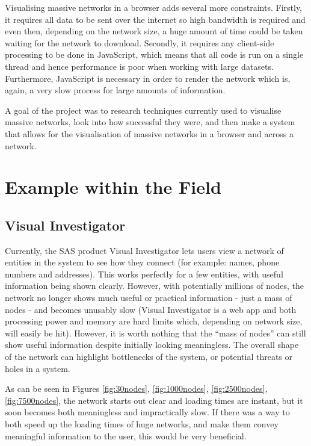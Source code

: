 \documentclass[../dissertation.tex]{subfiles}
\begin{document}
Visualising massive networks in a browser adds several more constraints. Firstly, it requires all data to be sent over the internet so high bandwidth is required and even then, depending on the network size, a huge amount of time could be taken waiting for the network to download. Secondly, it requires any client-side processing to be done in JavaScript, which means that all code is run on a single thread and hence performance is poor when working with large datasets. Furthermore, JavaScript is necessary in order to render the network which is, again, a very slow process for large amounts of information. 

A goal of the project was to research techniques currently used to visualise massive networks, look into how successful they were, and then make a system that allows for the visualisation of massive networks in a browser and across a network. 

\section{Example within the Field}

\subsection{Visual Investigator}
Currently, the SAS product Visual Investigator \cite{sasvi} lets users view a network of entities in the system to see how they connect (for example: names, phone numbers and addresses). This works perfectly for a few entities, with useful information being shown clearly. However, with potentially millions of nodes, the network no longer shows much useful or practical information - just a mass of nodes - and becomes unusably slow (Visual Investigator is a web app and both processing power and memory are hard limits which, depending on network size, will easily be hit). However, it is worth nothing that the ``mass of nodes'' can still show useful information despite initially looking meaningless. The overall shape of the network can highlight bottlenecks of the system, or potential threats or holes in a system.

As can be seen in Figures \ref{fig:30nodes}, \ref{fig:1000nodes}, \ref{fig:2500nodes}, \ref{fig:7500nodes}, the network starts out clear and loading times are instant, but it soon becomes both meaningless and impractically slow. If there was a way to both speed up the loading times of huge networks, and make them convey meaningful information to the user, this would be very beneficial.
\end{document}
